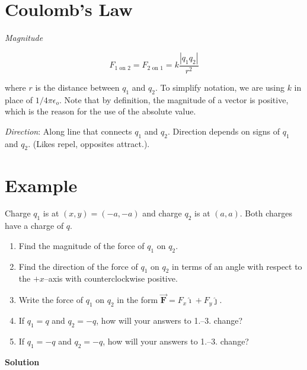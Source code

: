 \documentclass{article}
\renewcommand{\mbox}{\text}
\newcommand{\ihat}[0]{\hat{\boldsymbol{\imath}}}
\newcommand{\jhat}[0]{\hat{\boldsymbol{\jmath}}}
\newcommand{\bfvec}[1]{\vec{\mathbf{#1}}}
\begin{document}

\section{Coulomb's Law}

\emph{Magnitude}

$$F_{1\mbox{ on } 2}=F_{2\mbox{ on } 1}=k\frac{|q_1q_2|}{r^2}$$

where $r$ is the distance between $q_1$ and $q_2$. To simplify notation, we are using $k$ in place of $1/4\pi\epsilon_o$. Note that by definition, the magnitude of a vector is positive, which is the reason for the use of the absolute value.

\emph{Direction}: Along line that connects $q_1$ and $q_2$. Direction depends on signs of $q_1$ and $q_2$. (Likes repel, opposites attract.).

\section{Example}

Charge $q_1$ is at $(x,y)=(-a,-a)$ and charge $q_2$ is at $(a, a)$. Both charges have a charge of $q$.

\begin{enumerate}

  \item Find the magnitude of the force of $q_1$ on $q_2$.

  \item Find the direction of the force of $q_1$ on $q_2$ in terms of an angle with respect to the $+x$--axis with counterclockwise positive.

  \item Write the force of $q_1$ on $q_2$ in the form $\bfvec{F}=F_x\ihat + F_y\jhat$.

  \item If $q_1=q$ and $q_2=-q$, how will your answers to 1.--3. change?

  \item If $q_1=-q$ and $q_2=-q$, how will your answers to 1.--3. change?

\end{enumerate}

\textbf{Solution}
\end{document}
